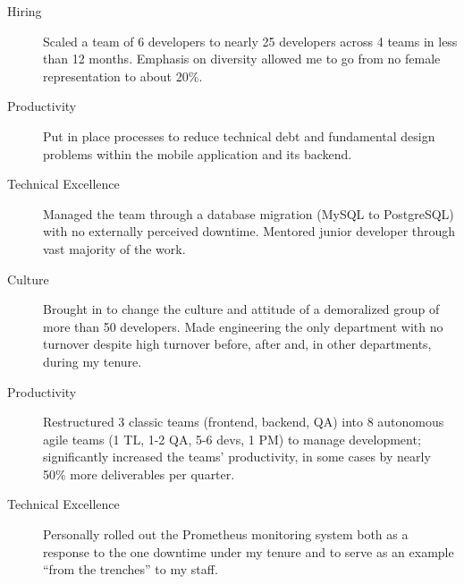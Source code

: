 \begin{langen}
\begin{description}%
\item[Hiring] Scaled a team of 6 developers to nearly 25 developers across 4 teams in less than 12 months. Emphasis on diversity allowed me to go from no female representation to about 20\%.
\item[Productivity] Put in place processes to reduce technical debt and fundamental design problems within the mobile application and its backend.
\item[Technical Excellence] Managed the team through a database migration (MySQL to PostgreSQL) with no externally perceived downtime. Mentored junior developer through vast majority of the work.
\end{description}
\end{langen}

\vspace{4 mm}

\begin{langen}
\begin{description}%
\item[Culture] Brought in to change the culture and attitude of a demoralized group of more than 50 developers. Made engineering the only department with no turnover despite high turnover before, after and, in other departments, during my tenure.
\item[Productivity] Restructured 3 classic teams (frontend, backend, QA) into 8 autonomous agile teams (1 TL, 1-2 QA, 5-6 devs, 1 PM) to manage development; significantly increased the teams' productivity, in some cases by nearly 50\% more deliverables per quarter.
\item[Technical Excellence] Personally rolled out the Prometheus monitoring system both as a response to the one downtime under my tenure and to serve as an example ``from the trenches'' to my staff.
\end{description}
\end{langen}

\vspace{4 mm}

